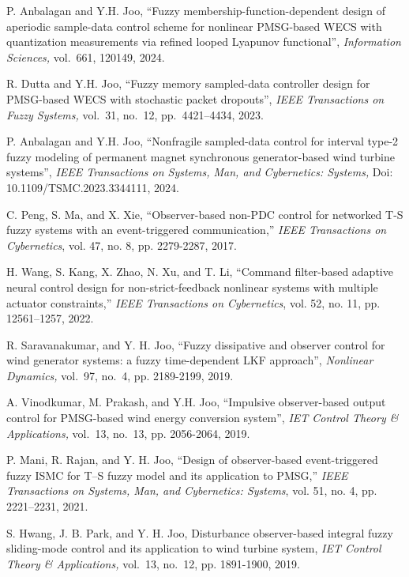 \documentclass[preprint,11pt]{elsarticle}
\begin{document}
\begin{thebibliography}{00}
{P.  Anbalagan and Y.H. Joo,  ``Fuzzy membership-function-dependent design of aperiodic sample-data control scheme for nonlinear PMSG-based WECS with quantization measurements via refined looped Lyapunov functional'', {\em Information Sciences,} vol.~661, 120149, 2024.}

{R. Dutta and Y.H. Joo, ``Fuzzy memory sampled-data controller design for PMSG-based WECS with stochastic packet dropouts'', {\em IEEE Transactions on Fuzzy Systems,} vol.~31, no.~12, pp.~4421--4434, 2023.}

{P.  Anbalagan and Y.H. Joo,  ``Nonfragile sampled-data control for interval type-2 fuzzy modeling of permanent magnet synchronous generator-based wind turbine systems'', {\em IEEE Transactions on Systems, Man, and Cybernetics: Systems,} Doi: 10.1109/TSMC.2023.3344111, 2024.}


C. Peng, S. Ma, and X. Xie, ``Observer-based non-PDC control for networked T-S fuzzy systems with an event-triggered communication,'' {\em  IEEE Transactions on Cybernetics}, vol. 47, no. 8, pp. 2279-2287, 2017.

H. Wang, S. Kang, X. Zhao, N. Xu, and T. Li, ``Command filter-based adaptive neural control design for non-strict-feedback nonlinear systems with multiple actuator constraints,'' {\em  IEEE Transactions on Cybernetics}, vol. 52, no. 11, pp. 12561--1257, 2022.

R. Saravanakumar, and Y. H. Joo, ``Fuzzy dissipative and observer control for wind generator systems: a fuzzy time-dependent LKF approach'',
{\em Nonlinear Dynamics,} vol.~97, no.~4, pp. 2189-2199, 2019.

A. Vinodkumar, M. Prakash, and Y.H. Joo, ``Impulsive observer-based output control for PMSG-based wind energy conversion system'', {\em IET Control Theory \& Applications,} vol.~13, no.~13, pp. 2056-2064, 2019.

P. Mani, R. Rajan, and Y. H. Joo, ``Design of observer-based event-triggered fuzzy ISMC for T–S fuzzy model and its application to PMSG,'' {\em  IEEE Transactions on Systems, Man, and Cybernetics: Systems}, vol. 51, no. 4, pp. 2221–2231, 2021.

S. Hwang, J. B. Park, and Y. H. Joo, Disturbance observer-based integral fuzzy sliding-mode control and its application to wind turbine system,
{\em IET Control Theory \& Applications,}  vol.~13, no.~12, pp. 1891-1900, 2019.


\end{thebibliography}
\end{document}
